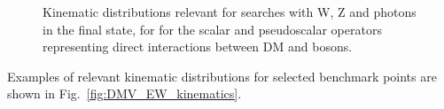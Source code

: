 \begin{figure}[h!]
  \centering
    \hfill
    \caption{Kinematic distributions relevant for searches with W, Z and photons in the final state,
    for for the scalar and pseudoscalar operators representing direct interactions between DM and bosons.}
    \label{fig:EFTD7_EW_kinematics}

\end{figure}

Examples of relevant kinematic distributions for selected benchmark points are
shown in Fig.~\ref{fig:DMV_EW_kinematics}.

